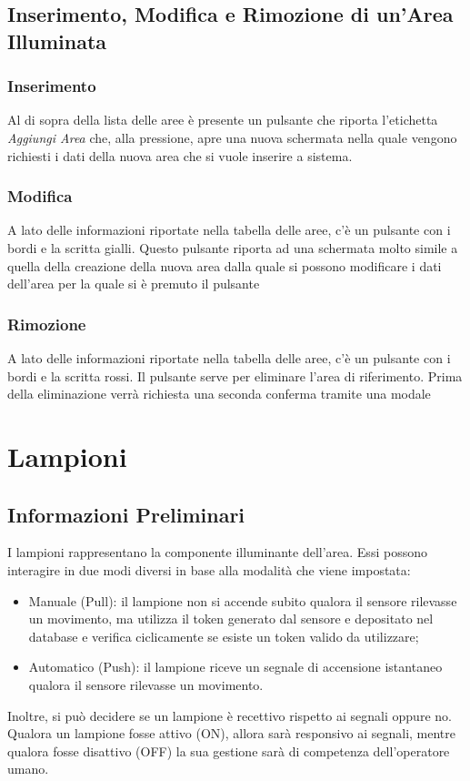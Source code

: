 \documentclass[a4paper, 12pt]{article}
\begin{document}
\subsection{Inserimento, Modifica e Rimozione di un'Area Illuminata}
\subsubsection{Inserimento}
Al di sopra della lista delle aree è presente un pulsante che riporta l'etichetta \textit{Aggiungi Area} che, alla pressione, apre una nuova schermata nella quale vengono richiesti i dati della nuova area che si vuole inserire a sistema.

\subsubsection{Modifica}
A lato delle informazioni riportate nella tabella delle aree, c'è un pulsante con i bordi e la scritta gialli. Questo pulsante riporta ad una schermata molto simile a quella della creazione della nuova area dalla quale si possono modificare i dati dell'area per la quale si è premuto il pulsante

\subsubsection{Rimozione}
A lato delle informazioni riportate nella tabella delle aree, c'è un pulsante con i bordi e la scritta rossi. Il pulsante serve per eliminare l'area di riferimento. Prima della eliminazione verrà richiesta una seconda conferma tramite una modale

\newpage
\section{Lampioni}
\subsection{Informazioni Preliminari}
I lampioni rappresentano la componente illuminante dell'area. Essi possono interagire in due modi diversi in base alla modalità che viene impostata:
\begin{itemize}
    \item Manuale (Pull): il lampione non si accende subito qualora il sensore rilevasse un movimento, ma utilizza il token generato dal sensore e depositato nel database e verifica ciclicamente se esiste un token valido da utilizzare;
    \item Automatico (Push): il lampione riceve un segnale di accensione istantaneo qualora il sensore rilevasse un movimento.
\end{itemize}
Inoltre, si può decidere se un lampione è recettivo rispetto ai segnali oppure no. Qualora un lampione fosse attivo (ON), allora sarà responsivo ai segnali, mentre qualora fosse disattivo (OFF) la sua gestione sarà di competenza dell'operatore umano.
\end{document}
